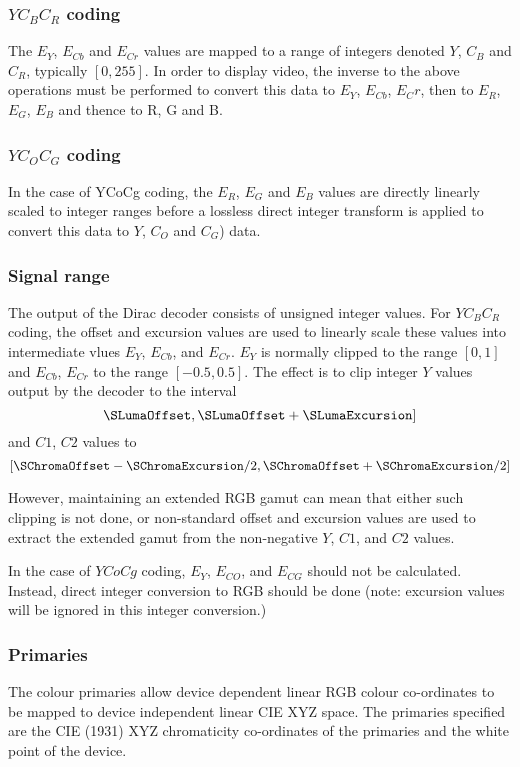 \begin{informative*}
\subsubsection{$YC_BC_R$ coding}

The $E_Y$, $E_{Cb}$ and $E_{Cr}$ values are
mapped to a range of integers denoted $Y$, $C_B$ and $C_R$, typically $[0,255]$.  In order to display video, the inverse to the above
operations must be performed to convert this data to $E_Y$, $E_{Cb}$, $E_Cr$, 
then to $E_R$, $E_G$, $E_B$ and thence to R, G and B.  

\subsubsection{$YC_OC_G$ coding}

In the case of YCoCg coding, the $E_R$, $E_G$ and $E_B$ values are directly
linearly scaled to integer ranges before a lossless 
direct integer transform is applied to convert this data to $Y$, $C_O$ and 
$C_G$) data.

\subsubsection{Signal range}
\label{signalranges}

The output of the Dirac decoder consists of unsigned integer values. For $YC_BC_R$ coding, the offset and excursion values are used to linearly scale these 
values into intermediate  vlues  $E_Y$, $E_{Cb}$, and $E_{Cr}$.
$E_Y$ is normally clipped to the range $[0,1]$ and $E_{Cb}$, $E_{Cr}$
to the range $[-0.5,0.5]$. The effect is to clip integer $Y$ values output by
the decoder to the interval
\[ \SLumaOffset, \SLumaOffset+\SLumaExcursion] \]
and $C1$, $C2$ values to
\[ [\SChromaOffset-\SChromaExcursion/2,\SChromaOffset+\SChromaExcursion/2] \]

However, maintaining an extended RGB gamut can mean that either such
clipping is not done, or non-standard offset and excursion values are
used to extract the extended gamut from the non-negative $Y$, $C1$,
and $C2$ values.

In the case of $YCoCg$ coding, $E_Y$, $E_{CO}$, and $E_{CG}$ should not be
 calculated. Instead, direct integer conversion to RGB should be done 
(note: excursion values will be ignored in this integer conversion.)

\subsubsection{Primaries}
\label{primaries}
The colour primaries allow device dependent linear RGB colour
co-ordinates to be mapped to device independent linear CIE XYZ space.
The primaries specified are the CIE (1931) XYZ chromaticity
co-ordinates of the primaries and the white point of the device. 


\end{informative*}
